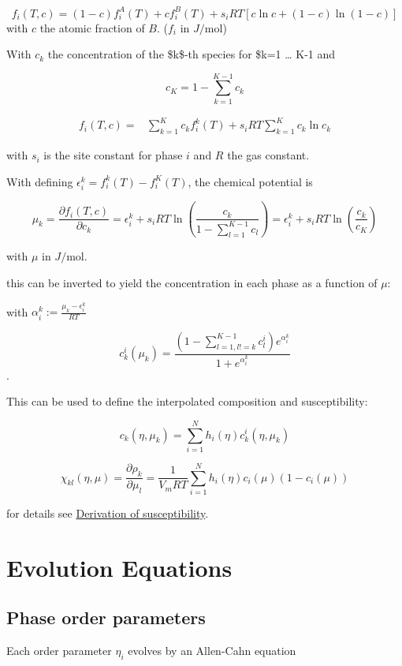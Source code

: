\documentclass[11pt]{article}
\begin{document}
$$
f_i(T,c) = (1-c) f_i^A(T) + c f_i^B(T) + s_i RT \left[ c \ln c + (1-c) \ln (1-c) \right]
$$
with \(c\) the atomic fraction of \(B\). (\(f_i\) in \(J/\text{mol}\))

With \(c_k\) the concentration of the \$k\$-th species for \$k=1 \dots{} K-1 and

$$
c_K = 1 - \sum_{k=1}^{K-1} c_k
$$

\begin{align*}
f_i(T,c) =& \sum_{k=1}^{K} c_k f_i^k(T) + s_i RT \sum_{k=1}^{K} c_k \ln c_k
\end{align*}

with \(s_i\) is the site constant for phase \(i\) and \(R\) the gas constant.

With defining \(\epsilon_i^k = f_i^k(T) - f_i^K(T)\), the chemical potential is


$$
\mu_k = \frac{\partial f_i(T,c)}{\partial c_k} = \epsilon_i^k + s_i R T \ln{\left(\frac{c_k}{1-\sum_{l=1}^{K-1} c_l}\right)} = \epsilon_i^k + s_i R T \ln{\left(\frac{c_k}{c_K}\right)}
$$

with \(\mu\) in \(J/\text{mol}\).

this can be inverted to yield the concentration in each phase as a function of \(\mu\):

with \(\alpha_i^k := \frac{\mu_k - \epsilon_i^k}{R T}\)

$$
c_k^i(\mu_k) = \frac{\left(1-\sum_{l=1, l != k}^{K-1} c_l^i \right) e^{\alpha_i^k}}{1 + e^{\alpha_i^k}}
$$.

This can be used to define the interpolated composition and susceptibility:

$$
c_k(\eta, \mu_k) = \sum_{i=1}^N h_i(\eta) c_k^i(\eta, \mu_k)
$$

$$
\chi_{kl}(\eta, \mu) = \frac{\partial \rho_k}{\partial \mu_l} = \frac{1}{V_m R T} \sum_{i=1}^N h_i(\eta) c_i(\mu) (1-c_i(\mu))
$$

for details see \hyperref[sec:orga844052]{Derivation of susceptibility}.

\section{Evolution Equations}
\label{sec:org4961ef6}

\subsection{Phase order parameters}
\label{sec:org246fdcc}

Each order parameter \(\eta_i\) evolves by an Allen-Cahn equation
\end{document}

